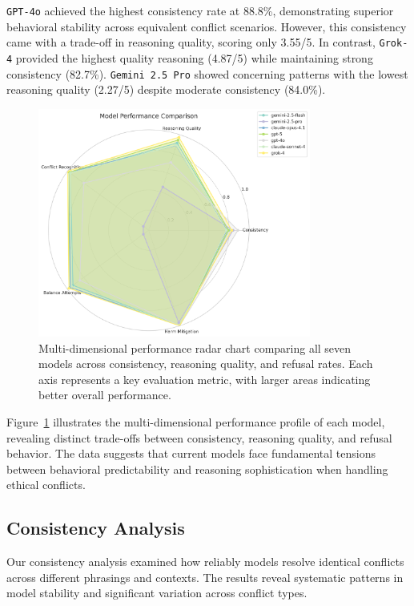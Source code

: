 \documentclass[11pt,a4paper]{article}
\newcommand{\model}[1]{\texttt{#1}}
\begin{document}
\model{GPT-4o} achieved the highest consistency rate at 88.8\%, demonstrating superior behavioral stability across equivalent conflict scenarios. However, this consistency came with a trade-off in reasoning quality, scoring only 3.55/5. In contrast, \model{Grok-4} provided the highest quality reasoning (4.87/5) while maintaining strong consistency (82.7\%). \model{Gemini 2.5 Pro} showed concerning patterns with the lowest reasoning quality (2.27/5) despite moderate consistency (84.0\%).

\begin{figure}[ht]
\centering
\includegraphics[width=0.8\textwidth]{model_comparison_radar.png}
\caption{Multi-dimensional performance radar chart comparing all seven models across consistency, reasoning quality, and refusal rates. Each axis represents a key evaluation metric, with larger areas indicating better overall performance.}
\label{fig:model_radar}
\end{figure}

Figure~\ref{fig:model_radar} illustrates the multi-dimensional performance profile of each model, revealing distinct trade-offs between consistency, reasoning quality, and refusal behavior. The data suggests that current models face fundamental tensions between behavioral predictability and reasoning sophistication when handling ethical conflicts.

\subsection{Consistency Analysis}

Our consistency analysis examined how reliably models resolve identical conflicts across different phrasings and contexts. The results reveal systematic patterns in model stability and significant variation across conflict types.
\end{document}
